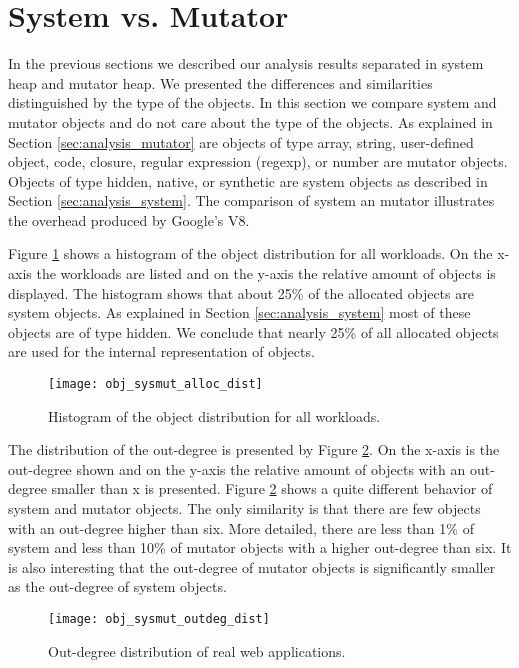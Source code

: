
\section{System vs. Mutator} \label{sec:analysis_sys_vs_mut}

In the previous sections we described our analysis results separated in system heap and mutator heap. We presented the differences and similarities distinguished by the type of the objects. In this section we compare system and mutator objects and do not care about the type of the objects. As explained in Section \ref{sec:analysis_mutator} are objects of type array, string, user-defined object, code, closure, regular expression (regexp), or number are mutator objects. Objects of type hidden, native, or synthetic are system objects as described in Section \ref{sec:analysis_system}. The comparison of system an mutator illustrates the overhead produced by Google's V8. 

Figure \ref{fig:obj_sysmut_alloc_dist} shows a histogram of the object distribution for all workloads. On the x-axis the workloads are listed and on the y-axis the relative amount of objects is displayed. The histogram shows that about 25\% of the allocated objects are system objects. As explained in Section \ref{sec:analysis_system} most of these objects are of type hidden. We conclude that nearly 25\% of all allocated objects are used for the internal representation of objects.
\begin{figure}
	\centering
	\texttt{[image: obj\_sysmut\_alloc\_dist]}
	\caption{Histogram of the object distribution for all workloads.}
	\label{fig:obj_sysmut_alloc_dist}
\end{figure}

The distribution of the out-degree is presented by Figure \ref{fig:obj_sysmut_outdeg_dist}. On the x-axis is the out-degree shown and on the y-axis the relative amount of objects with an out-degree smaller than x is presented. Figure \ref{fig:obj_sysmut_outdeg_dist} shows a quite different behavior of system and mutator objects. The only similarity is that there are few objects with an out-degree higher than six. More detailed, there are less than 1\% of system and less than 10\% of mutator objects with a higher out-degree than six. It is also interesting that the out-degree of mutator objects is significantly smaller as the out-degree of system objects.
\begin{figure}
	\centering
	\texttt{[image: obj\_sysmut\_outdeg\_dist]}
	\caption{Out-degree distribution of real web applications.}
	\label{fig:obj_sysmut_outdeg_dist}
\end{figure}

